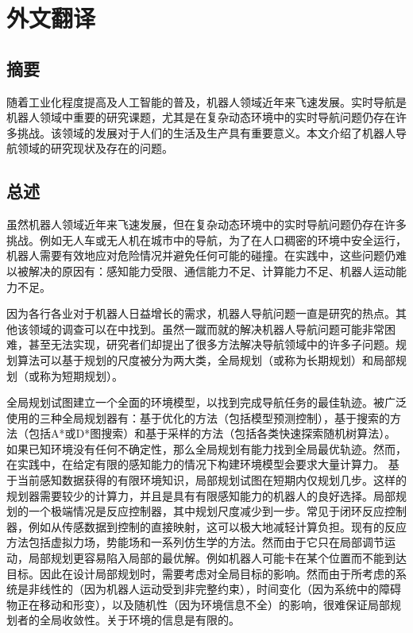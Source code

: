 \cleardoublepage
\chapter{外文翻译}

\section*{摘要}
随着工业化程度提高及人工智能的普及，机器人领域近年来飞速发展。实时导航是机器人领域中重要的研究课题，尤其是在复杂动态环境中的实时导航问题仍存在许多挑战。该领域的发展对于人们的生活及生产具有重要意义。本文介绍了机器人导航领域的研究现状及存在的问题。


\section{总述}

虽然机器人领域近年来飞速发展，但在复杂动态环境中的实时导航问题仍存在许多挑战。例如无人车或无人机在城市中的导航，为了在人口稠密的环境中安全运行，机器人需要有效地应对危险情况并避免任何可能的碰撞。在实践中，这些问题仍难以被解决的原因有：感知能力受限、通信能力不足、计算能力不足、机器人运动能力不足。

因为各行各业对于机器人日益增长的需求，机器人导航问题一直是研究的热点。其他该领域的调查可以在中找到。虽然一蹴而就的解决机器人导航问题可能非常困难，甚至无法实现，研究者们却提出了很多方法解决导航领域中的许多子问题。规划算法可以基于规划的尺度被分为两大类，全局规划（或称为长期规划）和局部规划（或称为短期规划）。

全局规划试图建立一个全面的环境模型，以找到完成导航任务的最佳轨迹。被广泛使用的三种全局规划器有：基于优化的方法（包括模型预测控制），基于搜索的方法（包括A*或D*图搜索）和基于采样的方法（包括各类快速探索随机树算法）。如果已知环境没有任何不确定性，那么全局规划有能力找到全局最优轨迹。然而，在实践中，在给定有限的感知能力的情况下构建环境模型会要求大量计算力。
基于当前感知数据获得的有限环境知识，局部规划试图在短期内仅规划几步。这样的规划器需要较少的计算力，并且是具有有限感知能力的机器人的良好选择。局部规划的一个极端情况是反应控制器，其中规划尺度减少到一步。常见于闭环反应控制器，例如从传感数据到控制的直接映射，这可以极大地减轻计算负担。现有的反应方法包括虚拟力场，势能场和一系列仿生学的方法。然而由于它只在局部调节运动，局部规划更容易陷入局部的最优解。例如机器人可能卡在某个位置而不能到达目标。因此在设计局部规划时，需要考虑对全局目标的影响。然而由于所考虑的系统是非线性的（因为机器人运动受到非完整约束），时间变化（因为系统中的障碍物正在移动和形变），以及随机性（因为环境信息不全）的影响，很难保证局部规划者的全局收敛性。关于环境的信息是有限的。

